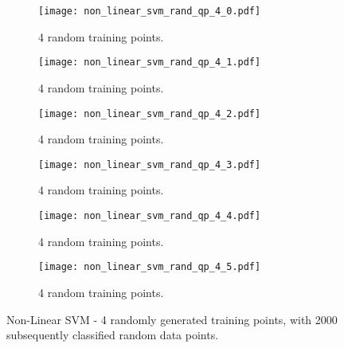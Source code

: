 \documentclass[10pt, a4paper,reqno]{amsart}
\begin{document}
\begin{figure}[H]
	\centering	
	\begin{subfigure}{0.5\textwidth}
		\centering
		\texttt{[image: non\_linear\_svm\_rand\_qp\_4\_0.pdf]}
		\caption{4 random training points.}
	\end{subfigure}%
	\begin{subfigure}{0.5\textwidth}
		\centering
		\texttt{[image: non\_linear\_svm\_rand\_qp\_4\_1.pdf]}
		\caption{4 random training points.}
	\end{subfigure}
	\begin{subfigure}{0.5\textwidth}
		\centering
		\texttt{[image: non\_linear\_svm\_rand\_qp\_4\_2.pdf]}
		\caption{4 random training points.}
	\end{subfigure}%
	\begin{subfigure}{0.5\textwidth}
		\centering
		\texttt{[image: non\_linear\_svm\_rand\_qp\_4\_3.pdf]}
		\caption{4 random training points.}
	\end{subfigure}
	\begin{subfigure}{0.5\textwidth}
		\centering
		\texttt{[image: non\_linear\_svm\_rand\_qp\_4\_4.pdf]}
		\caption{4 random training points.}
	\end{subfigure}%
	\begin{subfigure}{0.5\textwidth}
		\centering
		\texttt{[image: non\_linear\_svm\_rand\_qp\_4\_5.pdf]}
		\caption{4 random training points.}
	\end{subfigure}
	\caption{Non-Linear SVM - 4 randomly generated training points, with 2000 subsequently classified random data points.}
\end{figure}
\end{document}
